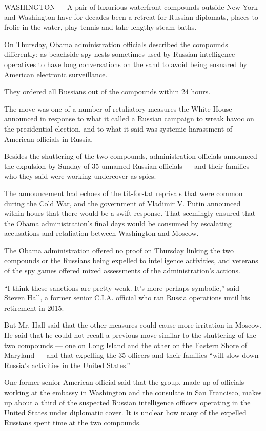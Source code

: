 WASHINGTON --- A pair of luxurious waterfront compounds outside New York
and Washington have for decades been a retreat for Russian diplomats,
places to frolic in the water, play tennis and take lengthy steam baths.

On Thursday, Obama administration officials described the compounds
differently: as beachside spy nests sometimes used by Russian
intelligence operatives to have long conversations on the sand to avoid
being ensnared by American electronic surveillance.

They ordered all Russians out of the compounds within 24 hours.

The move was one of a number of retaliatory measures the White House
announced in response to what it called a Russian campaign to wreak
havoc on the presidential election, and to what it said was systemic
harassment of American officials in Russia.

Besides the shuttering of the two compounds, administration officials
announced the expulsion by Sunday of 35 unnamed Russian officials ---
and their families --- who they said were working undercover as spies.

The announcement had echoes of the tit-for-tat reprisals that were
common during the Cold War, and the government of Vladimir V. Putin
announced within hours that there would be a swift response. That
seemingly ensured that the Obama administration's final days would be
consumed by escalating accusations and retaliation between Washington
and Moscow.

The Obama administration offered no proof on Thursday linking the two
compounds or the Russians being expelled to intelligence activities, and
veterans of the spy games offered mixed assessments of the
administration's actions.

``I think these sanctions are pretty weak. It's more perhaps symbolic,''
said Steven Hall, a former senior C.I.A. official who ran Russia
operations until his retirement in 2015.

But Mr. Hall said that the other measures could cause more irritation in
Moscow. He said that he could not recall a previous move similar to the
shuttering of the two compounds --- one on Long Island and the other on
the Eastern Shore of Maryland --- and that expelling the 35 officers and
their families ``will slow down Russia's activities in the United
States.''

One former senior American official said that the group, made up of
officials working at the embassy in Washington and the consulate in San
Francisco, makes up about a third of the suspected Russian intelligence
officers operating in the United States under diplomatic cover. It is
unclear how many of the expelled Russians spent time at the two
compounds.

